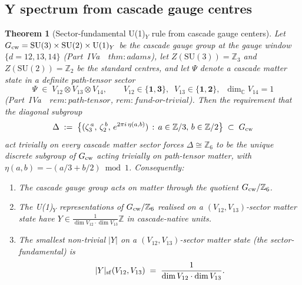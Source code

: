\documentclass[12pt,a4paper]{article}
\newtheorem{theorem}{Theorem}[section]
\begin{document}
\subsection{Y spectrum from cascade gauge centres}\label{subsec:y-spectrum-closure}

\begin{theorem}[Sector-fundamental U(1)$_Y$ rule from cascade gauge centers]\label{thm:sector-fundamental-y}
Let $G_{\rm cw}=\mathrm{SU}(3)\times\mathrm{SU}(2)\times\mathrm{U}(1)_Y$ be the cascade gauge group at the gauge window $\{d=12,13,14\}$ (Part~IVa~\cite{part4a}~$\mathit{thm{:}adams}$), let $Z(\mathrm{SU}(3))=\mathbb{Z}_3$ and $Z(\mathrm{SU}(2))=\mathbb{Z}_2$ be the standard centres, and let $\Psi$ denote a cascade matter state in a definite path-tensor sector
\[
\Psi \;\in\; V_{12}\otimes V_{13}\otimes V_{14},
\qquad V_{12}\in\{\mathbf{1},\mathbf{3}\},\;\; V_{13}\in\{\mathbf{1},\mathbf{2}\},\;\; \dim_{\mathbb{C}}V_{14}=1
\]
(Part~IVa~\cite{part4a}~$\mathit{rem{:}path\text{-}tensor}$, $\mathit{rem{:}fund\text{-}or\text{-}trivial}$). Then the requirement that the diagonal subgroup
\[
\Delta\;:=\;\bigl\{(\zeta_3^{\,a},\,\zeta_2^{\,b},\,e^{2\pi i\,\eta(a,b)})\,:\,a\in\mathbb{Z}/3,\,b\in\mathbb{Z}/2\bigr\}\;\subset\;G_{\rm cw}
\]
act trivially on every cascade matter sector forces $\Delta\cong\mathbb{Z}_6$ to be the unique discrete subgroup of $G_{\rm cw}$ acting trivially on path-tensor matter, with $\eta(a,b)=-(a/3+b/2)\bmod 1$. Consequently:
\begin{enumerate}[label=(\alph*),nosep]
\item The cascade gauge group acts on matter through the quotient $G_{\rm cw}/\mathbb{Z}_6$.
\item The U(1)$_Y$ representations of $G_{\rm cw}/\mathbb{Z}_6$ realised on a $(V_{12},V_{13})$-sector matter state have $Y\in\frac{1}{\dim V_{12}\cdot\dim V_{13}}\mathbb{Z}$ in cascade-native units.
\item The smallest non-trivial $|Y|$ on a $(V_{12},V_{13})$-sector matter state (the \emph{sector-fundamental}) is
\[
|Y|_{\rm sf}(V_{12},V_{13}) \;=\; \frac{1}{\dim V_{12}\cdot\dim V_{13}}.
\]
\end{enumerate}
\end{theorem}
\end{document}
